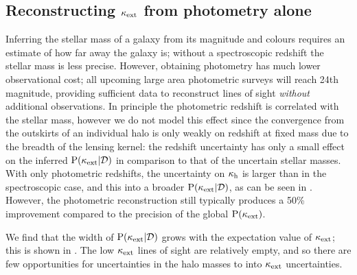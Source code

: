 \documentclass[useAMS,usenatbib,a4paper]{mn2e}
\begin{document}

\subsection{Reconstructing $\kappa_{\rm ext}$ from photometry alone}

Inferring the stellar mass of a galaxy from its magnitude and colours requires
an estimate of how far away the galaxy is; without a spectroscopic redshift
the \infered stellar mass is less precise. However, obtaining photometry has
much lower observational cost; all upcoming large area photometric surveys
will reach 24th magnitude, providing sufficient data to reconstruct lines of
sight  {\it without} additional observations. In principle the photometric
redshift is correlated with the \infered stellar mass, however we do not model
this effect since the convergence from the outskirts of an individual halo is
only weakly \dependant on redshift at fixed mass due to the breadth of the
lensing kernel: the redshift uncertainty has only a small effect on the
inferred ${\rm P}(\kappa_{\rm ext}|{\mathcal{D}})$ in comparison to that of  the uncertain stellar
masses.  With only photometric redshifts, the uncertainty on $\kappa_{\rm h}$ is
larger than in the spectroscopic case, and this \propogates into a broader
${\rm P}(\kappa_{\rm ext}|{\mathcal{D}})$, as can be seen in . However, the
photometric reconstruction still typically produces a 50\% improvement
compared to the precision of the global ${\rm P}(\kappa_{\rm ext})$. 


We find that the width of ${\rm P}(\kappa_{\rm ext}|{\mathcal{D}})$ grows with the expectation
value of $\kappa_{\rm ext}$; this is shown in . The low $\kappa_{\rm ext}$
lines of sight are relatively empty, and so there are few opportunities for
uncertainties in the halo masses to \propogate into $\kappa_{\rm ext}$ uncertainties.

%
\end{document}
